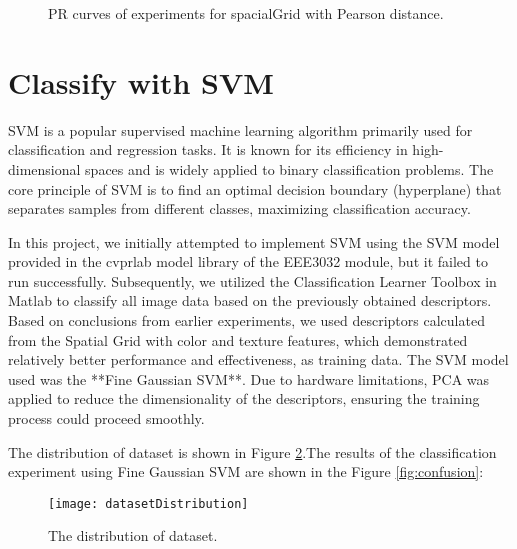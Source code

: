 \documentclass{article}
\begin{document}
\begin{figure}[!tbp]
  \centering
  \hfill
  \hfill
  \caption{\label{fig:pearson} PR curves of experiments for spacialGrid with Pearson distance.}
\end{figure}



\section{Classify with SVM}

SVM is a popular supervised machine learning algorithm primarily used for classification and regression tasks. It is known for its efficiency in high-dimensional spaces and is widely applied to binary classification problems. The core principle of SVM is to find an optimal decision boundary (hyperplane) that separates samples from different classes, maximizing classification accuracy.

In this project, we initially attempted to implement SVM using the SVM model provided in the cvprlab model library of the EEE3032 module, but it failed to run successfully. Subsequently, we utilized the Classification Learner Toolbox in Matlab to classify all image data based on the previously obtained descriptors. Based on conclusions from earlier experiments, we used descriptors calculated from the Spatial Grid with color and texture features, which demonstrated relatively better performance and effectiveness, as training data. The SVM model used was the **Fine Gaussian SVM**. Due to hardware limitations, PCA was applied to reduce the dimensionality of the descriptors, ensuring the training process could proceed smoothly.

The distribution of dataset is shown in Figure \ref{fig:distribution}.The results of the classification experiment using Fine Gaussian SVM are shown in the Figure \ref{fig:confusion}:


\begin{figure}[h]
  \begin{center}
  \texttt{[image: datasetDistribution]}
  \end{center}
  \caption{\label{fig:distribution} The distribution of dataset.}
  \end{figure}
\end{document}
